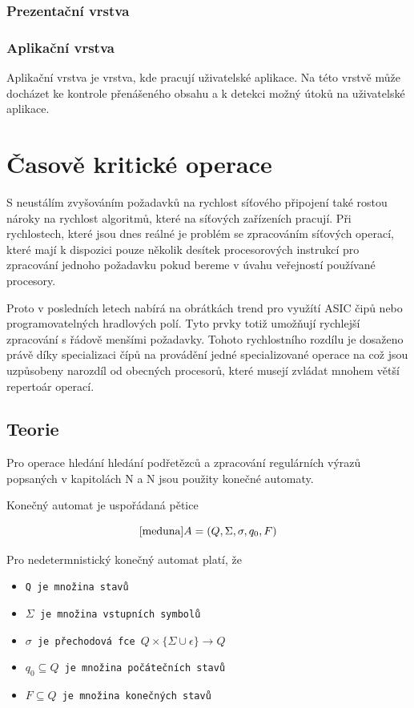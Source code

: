 \subsubsection{Prezentační vrstva}


\subsubsection{Aplikační vrstva}
Aplikační vrstva je vrstva, kde pracují uživatelské aplikace.
Na této vrstvě může docházet ke kontrole přenášeného obsahu a k detekci možný útoků na uživatelské aplikace.



\section{Časově kritické operace}
S neustálím zvyšováním požadavků na rychlost síťového připojení také rostou nároky na rychlost
algoritmů, které na síťových zařízeních pracují. Při rychlostech, které jsou dnes reálné je problém se zpracováním
síťových operací, které mají k dispozici pouze několik desítek procesorových instrukcí pro zpracování jednoho požadavku
pokud bereme v úvahu veřejností používané procesory.

Proto v posledních letech nabírá na obrátkách trend pro využítí ASIC čipů nebo programovatelných hradlových polí.
Tyto prvky totiž umožňují rychlejší zpracování s řádově menšími požadavky.
Tohoto rychlostního rozdílu je dosaženo právě díky specializaci čípů na provádění jedné specializované operace na což jsou uzpůsobeny
narozdíl od obecných procesorů, které musejí zvládat mnohem větší repertoár operací.

\subsection{Teorie}

Pro operace hledání hledání podřetězců a zpracování regulárních výrazů popsaných v kapitolách N a N
jsou použity konečné automaty.

Konečný automat je uspořádaná pětice

\begin{huge}
\begin{equation}\cite{meduna}
A=(Q,\Sigma, \sigma,q_0 ,F)
\end{equation}
\end{huge}

Pro nedetermnistický konečný automat platí, že
\begin{itemize}
\item{\tt{Q} je množina stavů}
\item{\tt{$\Sigma$} je množina vstupních symbolů}
\item{\tt{$\sigma$} je přechodová fce $Q \times \{\Sigma \cup \epsilon\} \rightarrow Q$}
\item{\tt{$q_0 \subseteq Q$} je množina počátečních stavů}
\item{\tt{$F \subseteq Q$} je množina konečných stavů}
\end{itemize}

